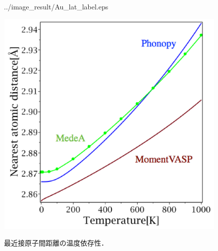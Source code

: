 \begin{figure}[htbp]
\begin{minipage}[b]{0.5\linewidth}
  {../image_result/Au_lat_label.eps}
  \label{he3}
 \end{minipage}
 \begin{minipage}[b]{0.5\linewidth}
  \centering
  \includegraphics[keepaspectratio, scale=0.42]
  {../image_result/Al_lat_label.eps}
  \label{he4}
 \end{minipage}
 \caption{最近接原子間距離の温度依存性．}\label{fig:heatexpantion}
\end{figure}

